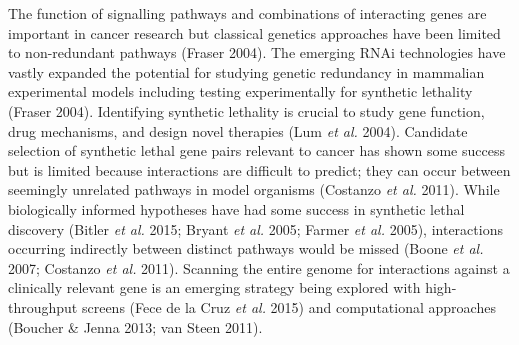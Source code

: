 

The function of signalling pathways and combinations of interacting genes are important in cancer research but classical genetics approaches have been limited to non-redundant pathways (Fraser 2004). The emerging RNAi technologies have vastly expanded the potential for studying genetic redundancy in mammalian experimental models including testing experimentally for synthetic lethality (Fraser 2004). Identifying synthetic lethality is crucial to study gene function, drug mechanisms, and design novel therapies (Lum\textit{ et al.} 2004). Candidate selection of synthetic lethal gene pairs relevant to cancer has shown some success but is limited because interactions are difficult to predict; they can occur between seemingly unrelated pathways in model organisms (Costanzo\textit{ et al.} 2011). While biologically informed hypotheses have had some success in synthetic lethal discovery (Bitler\textit{ et al.} 2015; Bryant\textit{ et al.} 2005; Farmer\textit{ et al.} 2005), interactions occurring indirectly between distinct pathways would be missed (Boone\textit{ et al.} 2007; Costanzo\textit{ et al.} 2011). Scanning the entire genome for interactions against a clinically relevant gene is an emerging strategy being explored with high-throughput screens (Fece de la Cruz\textit{ et al.} 2015) and computational approaches (Boucher \& Jenna 2013; van Steen 2011).  

